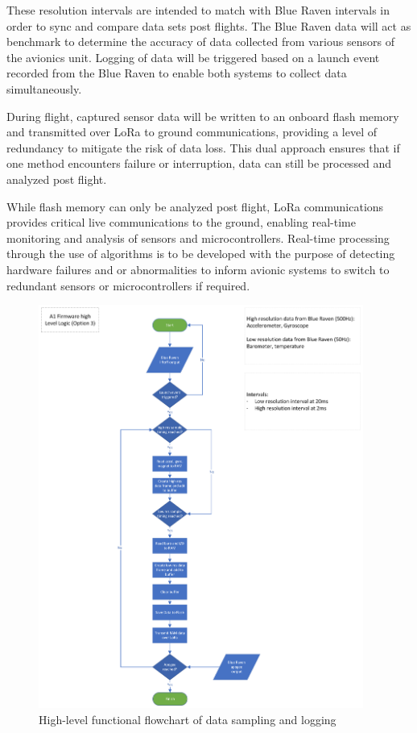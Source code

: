These resolution intervals are intended to match with Blue Raven intervals in order to sync and compare data sets post flights. The Blue Raven data will act as benchmark to determine the accuracy of data collected from various sensors of the avionics unit. Logging of data will be triggered based on a launch event recorded from the Blue Raven to enable both systems to collect data simultaneously. 

During flight, captured sensor data will be written to an onboard flash memory and transmitted over LoRa to ground communications, providing a level of redundancy to mitigate the risk of data loss. This dual approach ensures that if one method encounters failure or interruption, data can still be processed and analyzed post flight. 

While flash memory can only be analyzed post flight, LoRa communications provides critical live communications to the ground, enabling real-time monitoring and analysis of sensors and microcontrollers. Real-time processing through the use of algorithms is to be developed with the purpose of detecting hardware failures and or abnormalities to inform avionic systems to switch to redundant sensors or microcontrollers if required.  

\begin{figure}[h]
  \begin{center}
    \includegraphics[width=0.95\textwidth]{img/flowchart-high_level.png}
  \end{center}
  \caption{High-level functional flowchart of data sampling and logging}\label{fig:flowchart-high_level}
\end{figure}

